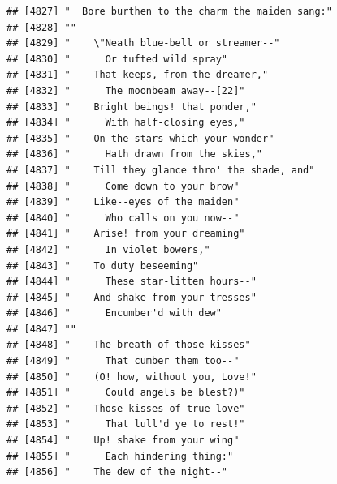 \documentclass{article}\usepackage[]{graphicx}\usepackage[]{color}
\makeatletter
\newenvironment{kframe}{%
 \def\at@end@of@kframe{}%
 \ifinner\ifhmode%
  \def\at@end@of@kframe{\end{minipage}}%
  \begin{minipage}{\columnwidth}%
 \fi\fi%
 \def\FrameCommand##1{\hskip\@totalleftmargin \hskip-\fboxsep
 \colorbox{shadecolor}{##1}\hskip-\fboxsep
     \hskip-\linewidth \hskip-\@totalleftmargin \hskip\columnwidth}%
 \MakeFramed {\advance\hsize-\width
   \@totalleftmargin\z@ \linewidth\hsize
   \@setminipage}}%
 {\par\unskip\endMakeFramed%
 \at@end@of@kframe}
\newenvironment{knitrout}{}{} %
\makeatother
\begin{document}
\begin{knitrout}
\begin{kframe}
\begin{verbatim}
## [4827] "  Bore burthen to the charm the maiden sang:"                                
## [4828] ""                                                                            
## [4829] "    \"Neath blue-bell or streamer--"                                         
## [4830] "      Or tufted wild spray"                                                  
## [4831] "    That keeps, from the dreamer,"                                           
## [4832] "      The moonbeam away--[22]"                                               
## [4833] "    Bright beings! that ponder,"                                             
## [4834] "      With half-closing eyes,"                                               
## [4835] "    On the stars which your wonder"                                          
## [4836] "      Hath drawn from the skies,"                                            
## [4837] "    Till they glance thro' the shade, and"                                   
## [4838] "      Come down to your brow"                                                
## [4839] "    Like--eyes of the maiden"                                                
## [4840] "      Who calls on you now--"                                                
## [4841] "    Arise! from your dreaming"                                               
## [4842] "      In violet bowers,"                                                     
## [4843] "    To duty beseeming"                                                       
## [4844] "      These star-litten hours--"                                             
## [4845] "    And shake from your tresses"                                             
## [4846] "      Encumber'd with dew"                                                   
## [4847] ""                                                                            
## [4848] "    The breath of those kisses"                                              
## [4849] "      That cumber them too--"                                                
## [4850] "    (O! how, without you, Love!"                                             
## [4851] "      Could angels be blest?)"                                               
## [4852] "    Those kisses of true love"                                               
## [4853] "      That lull'd ye to rest!"                                               
## [4854] "    Up! shake from your wing"                                                
## [4855] "      Each hindering thing:"                                                 
## [4856] "    The dew of the night--"                                                  

\end{verbatim}
\end{kframe}
\end{knitrout}
\end{document}
